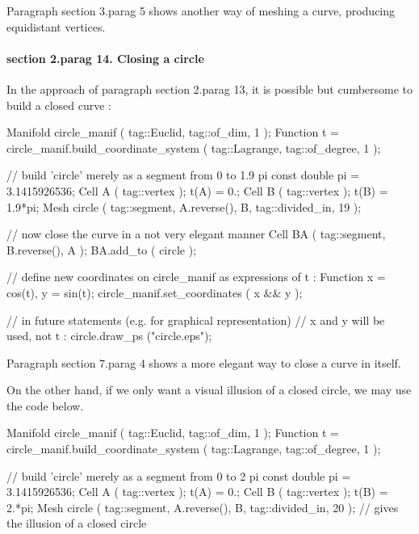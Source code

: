 Paragraph \numb section 3.\numb parag 5 shows another way of meshing a curve,
producing equidistant vertices.


\paragraph{\numb section 2.\numb parag 14. Closing a circle}

In the approach of paragraph \numb section 2.\numb parag 13, it is possible but cumbersome to
build a closed curve :

\verbatim
   Manifold circle_manif ( tag::Euclid, tag::of_dim, 1 );
   Function t = circle_manif.build_coordinate_system
      ( tag::Lagrange, tag::of_degree, 1 );

   // build 'circle' merely as a segment from 0 to 1.9 pi
   const double pi = 3.1415926536;
   Cell A ( tag::vertex );  t(A) =  0.;
   Cell B ( tag::vertex );  t(B) =  1.9*pi;
   Mesh circle ( tag::segment, A.reverse(), B, tag::divided_in, 19 );

   // now close the curve in a not very elegant manner
   Cell BA ( tag::segment, B.reverse(), A );
   BA.add_to ( circle );

   // define new coordinates on circle_manif as expressions of t :
   Function x = cos(t), y = sin(t);
   circle_manif.set_coordinates ( x && y );

   // in future statements (e.g. for graphical representation)
   // x and y will be used, not t :
   circle.draw_ps ("circle.eps");
\endverbatim


Paragraph \numb section 7.\numb parag 4 shows a more elegant way to close a curve in itself.

On the other hand, if we only want a visual illusion of a closed circle, we may use the code below.

\verbatim
   Manifold circle_manif ( tag::Euclid, tag::of_dim, 1 );
   Function t = circle_manif.build_coordinate_system
      ( tag::Lagrange, tag::of_degree, 1 );

   // build 'circle' merely as a segment from 0 to 2 pi
   const double pi = 3.1415926536;
   Cell A ( tag::vertex );  t(A) =  0.;
   Cell B ( tag::vertex );  t(B) =  2.*pi;
   Mesh circle ( tag::segment, A.reverse(), B, tag::divided_in, 20 );
   // gives the illusion of a closed circle

